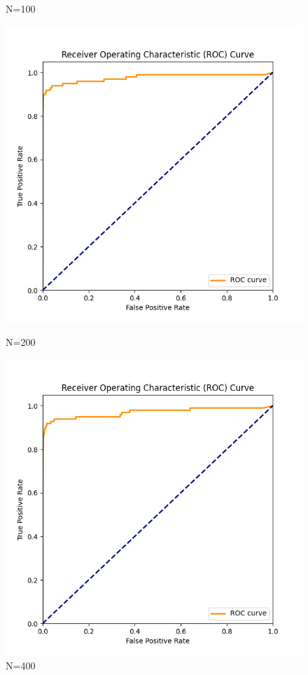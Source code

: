 \documentclass[8pt]{article}
\begin{document}
\begin{figure}[H]
\begin{minipage}{0.24\textwidth}
        \caption{N=100}
        \label{fig:roc_curve_N_100_K_7}
    \end{minipage}
    \begin{minipage}{0.24\textwidth}
        \centering
        \includegraphics[width=\textwidth]{../Prob1/out/rand_seed_14/task3/roc_curve_N_200_K_7.png}
        \caption{N=200}
        \label{fig:roc_curve_N_200_K_7}
    \end{minipage}
    \begin{minipage}{0.24\textwidth}
        \centering
        \includegraphics[width=\textwidth]{../Prob1/out/rand_seed_14/task3/roc_curve_N_400_K_7.png}
        \caption{N=400}
        \label{roc_curve_N_400_K_7}
    \end{minipage}
\end{figure}
\end{document}
